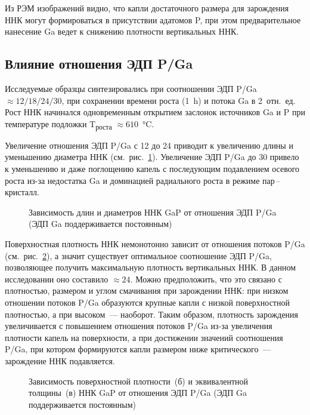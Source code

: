 Из РЭМ изображений видно, что капли достаточного размера для зарождения ННК
могут формироваться в присутствии адатомов P, при этом предварительное
нанесение Ga ведет к снижению плотности вертикальных ННК.

\subsection{Влияние отношения ЭДП P/Ga}\label{subsec:ch6/sec2/sub2}

Исследуемые образцы синтезировались при соотношении ЭДП P/Ga \(\approx
12/18/24/30\), при сохранении времени роста (1~\si{\hour}) и потока Ga в
2~отн.~ед. Рост ННК начинался одновременным открытием заслонок источников Ga и
P при температуре подложки T\textsubscript{роста} \(\approx
610\)~\si{\degreeCelsius}.

Увеличение отношения ЭДП P/Ga с 12 до 24 приводит к увеличению длины и
уменьшению диаметра ННК (см.~рис.~\cref{fig:Image_41_1}). Увеличение ЭДП P/Ga
до 30 привело к уменьшению и даже поглощению капель с последующим подавлением
осевого роста из-за недостатка Ga и доминацией радиального роста в режиме
пар\,--\,кристалл.

\begin{figure}[ht]  \caption{Зависимость длин
и диаметров ННК GaP от отношения ЭДП P/Ga (ЭДП Ga поддерживается
постоянным)}\label{fig:Image_41_1} \end{figure}

Поверхностная плотность ННК немонотонно зависит от отношения потоков P/Ga
(см.~рис.~\cref{fig:Image_41_23}), а значит существует оптимальное соотношение
ЭДП P/Ga, позволяющее получить максимальную плотность вертикальных ННК. В
данном исследовании оно составило \(\approx 24\). Можно предположить, что это
связано с плотностью, размером и углом смачивания при зарождении ННК: при
низком отношении потоков P/Ga образуются крупные капли с низкой поверхностной
плотностью, а при высоком~--- наоборот. Таким образом, плотность зарождения
увеличивается с повышением отношения потоков P/Ga из-за увеличения плотности
капель на поверхности, а при достижении значений соотношения P/Ga, при котором
формируются капли размером ниже критического~--- зарождение ННК подавляется.

\begin{figure}[ht]  \caption{Зависимость
	поверхностной плотности~(б) и эквивалентной толщины~(в) ННК GaP от отношения
ЭДП P/Ga (ЭДП Ga поддерживается постоянным)}\label{fig:Image_41_23}
\end{figure}

